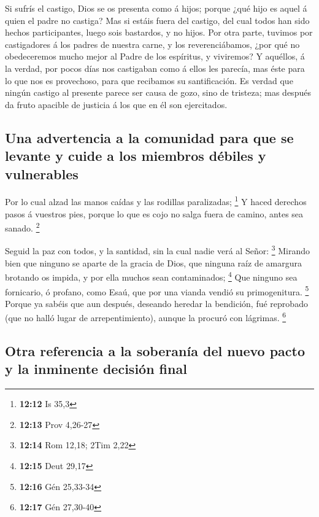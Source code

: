  Si sufrís el castigo, Dios se os presenta como á hijos;
porque ¿qué hijo es aquel á quien el padre no castiga?  Mas
si estáis fuera del castigo, del cual todos han sido hechos
participantes, luego sois bastardos, y no hijos.  Por otra
parte, tuvimos por castigadores á los padres de nuestra carne, y los
reverenciábamos, ¿por qué no obedeceremos mucho mejor al Padre de los
espíritus, y viviremos?  Y aquéllos, á la verdad, por pocos
días nos castigaban como á ellos les parecía, mas éste para lo que nos
es provechoso, para que recibamos su santificación.  Es
verdad que ningún castigo al presente parece ser causa de gozo, sino de
tristeza; mas después da fruto apacible de justicia á los que en él son
ejercitados.

\hypertarget{una-advertencia-a-la-comunidad-para-que-se-levante-y-cuide-a-los-miembros-duxe9biles-y-vulnerables}{%
\subsection{Una advertencia a la comunidad para que se levante y cuide a
los miembros débiles y
vulnerables}\label{una-advertencia-a-la-comunidad-para-que-se-levante-y-cuide-a-los-miembros-duxe9biles-y-vulnerables}}

 Por lo cual alzad las manos caídas y las rodillas
paralizadas; \footnote{\textbf{12:12} Is 35,3}  Y haced
derechos pasos á vuestros pies, porque lo que es cojo no salga fuera de
camino, antes sea sanado. \footnote{\textbf{12:13} Prov 4,26-27}

 Seguid la paz con todos, y la santidad, sin la cual nadie
verá al Señor: \footnote{\textbf{12:14} Rom 12,18; 2Tim 2,22}
 Mirando bien que ninguno se aparte de la gracia de Dios,
que ninguna raíz de amargura brotando os impida, y por ella muchos sean
contaminados; \footnote{\textbf{12:15} Deut 29,17}  Que
ninguno sea fornicario, ó profano, como Esaú, que por una vianda vendió
su primogenitura. \footnote{\textbf{12:16} Gén 25,33-34} 
Porque ya sabéis que aun después, deseando heredar la bendición, fué
reprobado (que no halló lugar de arrepentimiento), aunque la procuró con
lágrimas. \footnote{\textbf{12:17} Gén 27,30-40}

\hypertarget{otra-referencia-a-la-soberanuxeda-del-nuevo-pacto-y-la-inminente-decisiuxf3n-final}{%
\subsection{Otra referencia a la soberanía del nuevo pacto y la
inminente decisión
final}\label{otra-referencia-a-la-soberanuxeda-del-nuevo-pacto-y-la-inminente-decisiuxf3n-final}}

